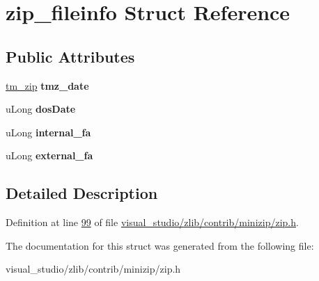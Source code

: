 \hypertarget{structzip__fileinfo}{}\section{zip\+\_\+fileinfo Struct Reference}
\label{structzip__fileinfo}
\subsection*{Public Attributes}
\begin{DoxyCompactItemize}
\item 
\mbox{\label{structzip__fileinfo_ae09a694a598b7507d23705764c9e46fb}} 
\hyperlink{structtm__zip__s}{tm\+\_\+zip} {\bfseries tmz\+\_\+date}
\item 
\mbox{\label{structzip__fileinfo_a0541c57e59450fbc17b2f898ca4bc9e8}} 
u\+Long {\bfseries dos\+Date}
\item 
\mbox{\label{structzip__fileinfo_a396175a434b86115ce5600ab1dbb1644}} 
u\+Long {\bfseries internal\+\_\+fa}
\item 
\mbox{\label{structzip__fileinfo_ac0be78ded330ffd46815bafc5b6b37bb}} 
u\+Long {\bfseries external\+\_\+fa}
\end{DoxyCompactItemize}


\subsection{Detailed Description}


Definition at line \hyperlink{visual__studio_2zlib_2contrib_2minizip_2zip_8h_source_l00099}{99} of file \hyperlink{visual__studio_2zlib_2contrib_2minizip_2zip_8h_source}{visual\+\_\+studio/zlib/contrib/minizip/zip.\+h}.



The documentation for this struct was generated from the following file\+:\begin{DoxyCompactItemize}
\item 
visual\+\_\+studio/zlib/contrib/minizip/zip.\+h\end{DoxyCompactItemize}
